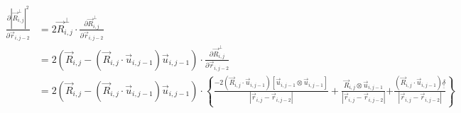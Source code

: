 \documentclass{article}
\renewcommand{\ij}{_{i,j}}
\newcommand{\ijj}{_{i,j-1}}
\newcommand{\ijjj}{_{i,j-2}}
\newcommand{\magn}[1]{\left\vert #1 \right\vert }
\renewcommand{\part}[2]{\frac{\partial #1 }{\partial #2}}
\newcommand{\ten}[1]{\underline{\underline{#1}}}
\newcommand{\rij}{\vec{r} \ij}
\newcommand{\Rij}{\vec{R} \ij}
\newcommand{\rijjj}{\vec{r} \ijjj}
\newcommand{\uijj}{\vec{u} \ijj}
\begin{document}
\begin{align*}
  \part{
    \magn{\Rij^\perp}^2
  }{ \rijjj }
  &= 
  2 \Rij^\perp \cdot \part{\Rij^\perp}{\rijjj}
  \\
  &= 
  2
  \left(
  \vec{R} \ij 
  - 
  \left(\vec{R} \ij \cdot \vec{u} \ijj \right) 
  \vec{u} \ijj 
  \right)
  \cdot 
  \part{\Rij^\perp}{\rijjj}
  \\
  &= 
  2
  \left(
  \vec{R} \ij 
  - 
  \left(\vec{R} \ij \cdot \vec{u} \ijj \right) 
  \vec{u} \ijj 
  \right)
  \cdot 
  \left\{
    \frac{
      -
  2
      \left(
        \Rij\cdot \uijj 
      \right)
      \left[
       \uijj 
      \otimes \uijj 
      \right]
      }{\magn{\rij - \rijjj}}
       + 
    \frac{
  \Rij 
  \otimes \uijj 
      }{\magn{\rij - \rijjj}}
  {
    +
  \frac{
  \left(
    \Rij 
    \cdot 
    \uijj 
  \right)
  \ten{\delta}
    }{\magn{\rij - \rijjj}}
  }
  \right\}
\end{align*}
\end{document}
